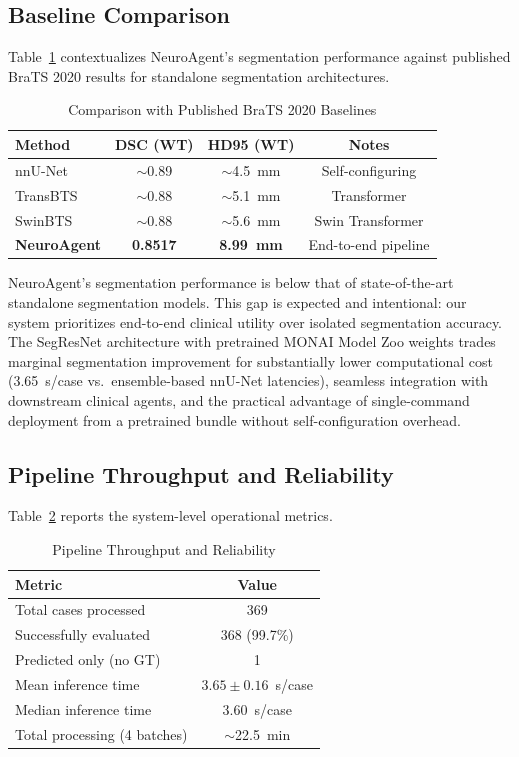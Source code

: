 \subsection{Baseline Comparison}
Table~\ref{tab:baselines} contextualizes NeuroAgent's segmentation performance against published BraTS 2020 results for standalone segmentation architectures.

\begin{table}[t]
\centering
\caption{Comparison with Published BraTS 2020 Baselines}
\label{tab:baselines}
\begin{tabular}{lccc}
\hline
\textbf{Method} & \textbf{DSC (WT)} & \textbf{HD95 (WT)} & \textbf{Notes} \\
\hline
nnU-Net~\cite{isensee2021nnu} & $\sim$0.89 & $\sim$4.5~mm & Self-configuring \\
TransBTS~\cite{wang2021transbts} & $\sim$0.88 & $\sim$5.1~mm & Transformer \\
SwinBTS~\cite{jiang2022swinbts} & $\sim$0.88 & $\sim$5.6~mm & Swin Transformer \\
\textbf{NeuroAgent} & \textbf{0.8517} & \textbf{8.99~mm} & End-to-end pipeline \\
\hline
\end{tabular}
\end{table}

NeuroAgent's segmentation performance is below that of state-of-the-art standalone segmentation models. This gap is expected and intentional: our system prioritizes end-to-end clinical utility over isolated segmentation accuracy. The SegResNet architecture with pretrained MONAI Model Zoo weights trades marginal segmentation improvement for substantially lower computational cost (3.65~s/case vs.\ ensemble-based nnU-Net latencies), seamless integration with downstream clinical agents, and the practical advantage of single-command deployment from a pretrained bundle without self-configuration overhead.

\subsection{Pipeline Throughput and Reliability}
Table~\ref{tab:throughput} reports the system-level operational metrics.

\begin{table}[t]
\centering
\caption{Pipeline Throughput and Reliability}
\label{tab:throughput}
\begin{tabular}{lc}
\hline
\textbf{Metric} & \textbf{Value} \\
\hline
Total cases processed & 369 \\
Successfully evaluated & 368 (99.7\%) \\
Predicted only (no GT) & 1 \\
Mean inference time & $3.65 \pm 0.16$~s/case \\
Median inference time & 3.60~s/case \\
Total processing (4 batches) & $\sim$22.5~min \\
\hline
\end{tabular}
\end{table}

